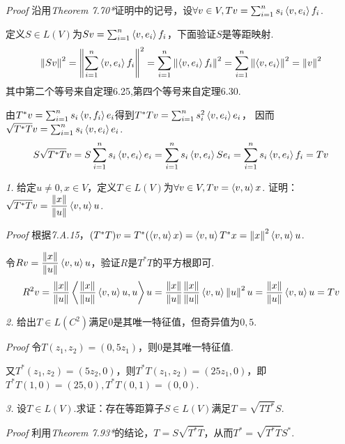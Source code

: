 \textit{Proof}
沿用\textit{Theorem 7.70*}证明中的记号，设\(\forall v \in V,Tv=\sum_{i=1}^n s_i\ip{v}{e_i}f_i\).

定义\(S \in L(V)\)为\(Sv=\sum_{i=1}^n \ip{v}{e_i}f_i\)，下面验证\(S\)是等距映射.
    \begin{align*}
        \norm{Sv}^2=\norm{\sum_{i=1}^n \ip{v}{e_i}f_i}^2=\sum_{i=1}^n \norm{\ip{v}{e_i}f_i}^2
        =\sum_{i=1}^n \norm{\ip{v}{e_i}}^2=\norm{v}^2
    \end{align*}
其中第二个等号来自定理6.25,第四个等号来自定理6.30.

由\(T^*v=\sum_{i=1}^n s_i\ip{v}{f_i}e_i\)得到\(T^*Tv=\sum_{i=1}^n s_i^2 \ip{v}{e_i}e_i\)，
因而\(\sqrt{T^*T}v=\sum_{i=1}^n s_i\ip{v}{e_i}e_i\).
    \begin{align*}
        S\sqrt{T^*T}v=S\sum_{i=1}^n s_i\ip{v}{e_i}e_i=\sum_{i=1}^n s_i\ip{v}{e_i}Se_i
        =\sum_{i=1}^n s_i\ip{v}{e_i}f_i=Tv
    \end{align*}

\newpage

\textit{1.}
给定\(u \ne 0,x \in V\)，定义\(T \in L(V)\)为\(\forall v \in V,Tv=\ip{v}{u}x\).
证明：\(\sqrt{T^*T}v=\dfrac{\norm{x}}{\norm{u}}\ip{v}{u}u\).

\textit{Proof}
根据\textit{7.A.15}，\((T^*T)v=T^*(\ip{v}{u}x)=\ip{v}{u}T^*x=\norm{x}^2\ip{v}{u}u\).

令\(Rv=\dfrac{\norm{x}}{\norm{u}}\ip{v}{u}u\)，验证\(R\)是\(T^*T\)的平方根即可.
    \begin{align*}
        R^2v=\dfrac{\norm{x}}{\norm{u}}\ip{\dfrac{\norm{x}}{\norm{u}}\ip{v}{u}u}{u}u
        =\dfrac{\norm{x}}{\norm{u}}\dfrac{\norm{x}}{\norm{u}}\ip{v}{u}\norm{u}^2u
        =\dfrac{\norm{x}}{\norm{u}}\ip{v}{u}u=Tv
    \end{align*}

\hspace*{\fill}

\textit{2.}
给出\(T \in L(C^2)\)满足\(0\)是其唯一特征值，但奇异值为\(0,5\).

\textit{Proof}
令\(T(z_1,z_2)=(0,5z_1)\)，则\(0\)是其唯一特征值.

又\(T^*(z_1,z_2)=(5z_2,0)\)，则\(T^*T(z_1,z_2)=(25z_1,0)\)，即\(T^*T(1,0)=(25,0),T^*T(0,1)=(0,0)\).

\hspace*{\fill}

\textit{3.}
设\(T \in L(V)\).求证：存在等距算子\(S \in L(V)\)满足\(T=\sqrt{TT^*}S\).

\textit{Proof}
利用\textit{Theorem 7.93*}的结论，\(T=S\sqrt{T^*T}\)，从而\(T^*=\sqrt{T^*T}S^*\).

